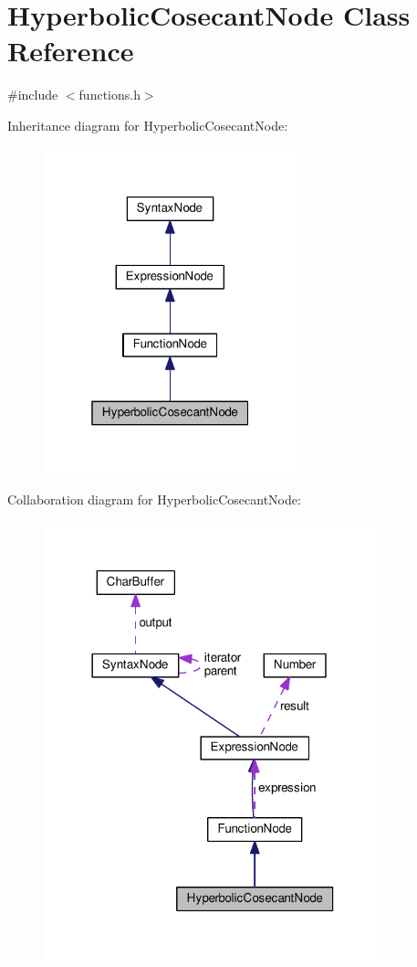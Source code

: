 \hypertarget{classHyperbolicCosecantNode}{}\section{Hyperbolic\+Cosecant\+Node Class Reference}
\label{classHyperbolicCosecantNode}


{\ttfamily \#include $<$functions.\+h$>$}



Inheritance diagram for Hyperbolic\+Cosecant\+Node\+:
\nopagebreak
\begin{figure}[H]
\begin{center}
\leavevmode
\includegraphics[width=208pt]{db/df9/classHyperbolicCosecantNode__inherit__graph}
\end{center}
\end{figure}


Collaboration diagram for Hyperbolic\+Cosecant\+Node\+:
\nopagebreak
\begin{figure}[H]
\begin{center}
\leavevmode
\includegraphics[width=278pt]{d7/d45/classHyperbolicCosecantNode__coll__graph}
\end{center}
\end{figure}
